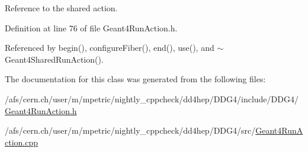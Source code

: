 Reference to the shared action. 



Definition at line 76 of file Geant4\+Run\+Action.\+h.



Referenced by begin(), configure\+Fiber(), end(), use(), and $\sim$\+Geant4\+Shared\+Run\+Action().



The documentation for this class was generated from the following files\+:\begin{DoxyCompactItemize}
\item 
/afs/cern.\+ch/user/m/mpetric/nightly\+\_\+cppcheck/dd4hep/\+D\+D\+G4/include/\+D\+D\+G4/\hyperlink{_geant4_run_action_8h}{Geant4\+Run\+Action.\+h}\item 
/afs/cern.\+ch/user/m/mpetric/nightly\+\_\+cppcheck/dd4hep/\+D\+D\+G4/src/\hyperlink{_geant4_run_action_8cpp}{Geant4\+Run\+Action.\+cpp}\end{DoxyCompactItemize}
